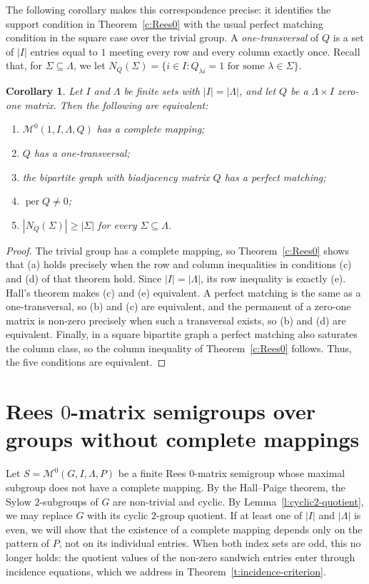 \documentclass[11pt]{article}
\theoremstyle{plain}
\newtheorem{cor}[theorem]{Corollary}
\theoremstyle{remark}
\theoremstyle{definition}
\theoremstyle{plain}
\begin{document}
\begingroup
The following corollary makes this correspondence precise: it identifies
the support condition in Theorem~\ref{c:Rees0} with the usual perfect
matching condition in the square case over the trivial group. A
\emph{one-transversal} of $Q$ is a set of $|I|$ entries equal to $1$ meeting
every row and every column exactly once.
{Recall that, for $\Sigma\subseteq\Lambda$, we let
$N_Q(\Sigma)=\{i\in I:Q_{\lambda i}=1
\text{ for some }\lambda\in\Sigma\}$.}
\begin{cor}\label{cor:rees0-hall-square}
Let $I$ and $\Lambda$ be finite sets with $|I|=|\Lambda|$, and let $Q$ be a
$\Lambda\times I$ zero-one matrix. Then the following are equivalent:
\begin{enumerate}\itemsep0pt
\item $\mathcal M^0(1,I,\Lambda,Q)$ has a complete mapping;
\item $Q$ has a one-transversal;
\item the bipartite graph with biadjacency matrix $Q$ has a perfect matching;
\item $\operatorname{per}Q\ne0$;
\item $|N_Q(\Sigma)|\ge|\Sigma|$ for every $\Sigma\subseteq\Lambda$.
\end{enumerate}
\end{cor}
\begin{proof}
The trivial group has a complete mapping, so Theorem~\ref{c:Rees0} shows that
(a) holds precisely when the row and column inequalities in conditions (c)
and (d) of that theorem hold. Since $|I|=|\Lambda|$, its row inequality is
exactly (e). Hall's theorem makes (c) and (e) equivalent. A perfect matching
is the same as a one-transversal, so (b) and (c) are equivalent, and the
permanent of a zero-one matrix is non-zero precisely when such a transversal
exists, so (b) and (d) are equivalent. Finally, in a square bipartite graph a
perfect matching also saturates the column class, so the column inequality of
Theorem~\ref{c:Rees0} follows. Thus, the five conditions are equivalent.
\end{proof}
\endgroup

\section[Rees 0-matrix semigroups over groups without complete mappings]{Rees $0$-matrix semigroups over groups without complete mappings}
\label{Sec:Rees0-matrix-2}

Let $S=\mathcal M^0(G,I,\Lambda,P)$ be a finite Rees $0$-matrix semigroup
whose maximal subgroup does not have a complete mapping. By the Hall--Paige
theorem, the Sylow $2$-subgroups of $G$ are non-trivial and cyclic. By Lemma~\ref{l:cyclic2-quotient}, we may replace $G$ with its cyclic $2$-group quotient.
If at least one of $|I|$ and $|\Lambda|$ is even, we will show that the existence of a complete mapping depends only on the pattern of $P$, not on its individual entries. When both index sets are odd, this no longer holds: the quotient values of the non-zero sandwich entries enter through
incidence equations, which we address in Theorem~\ref{t:incidence-criterion}.
\end{document}
